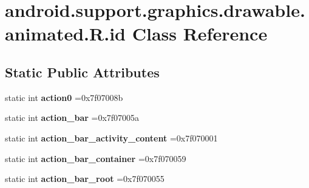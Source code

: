 \hypertarget{classandroid_1_1support_1_1graphics_1_1drawable_1_1animated_1_1R_1_1id}{}\section{android.\+support.\+graphics.\+drawable.\+animated.\+R.\+id Class Reference}
\label{classandroid_1_1support_1_1graphics_1_1drawable_1_1animated_1_1R_1_1id}
\subsection*{Static Public Attributes}
\begin{DoxyCompactItemize}
\item 
\mbox{\label{classandroid_1_1support_1_1graphics_1_1drawable_1_1animated_1_1R_1_1id_ae60d26279e96b553af1dbedf786c1719}} 
static int {\bfseries action0} =0x7f07008b
\item 
\mbox{\label{classandroid_1_1support_1_1graphics_1_1drawable_1_1animated_1_1R_1_1id_a273f56231c5bf8eebfc4998f29507892}} 
static int {\bfseries action\+\_\+bar} =0x7f07005a
\item 
\mbox{\label{classandroid_1_1support_1_1graphics_1_1drawable_1_1animated_1_1R_1_1id_ac41a847570f88ac8ca2ac8d0fc96dca9}} 
static int {\bfseries action\+\_\+bar\+\_\+activity\+\_\+content} =0x7f070001
\item 
\mbox{\label{classandroid_1_1support_1_1graphics_1_1drawable_1_1animated_1_1R_1_1id_a9b200b4c92700563eb5355a774a4a4d0}} 
static int {\bfseries action\+\_\+bar\+\_\+container} =0x7f070059
\item 
\mbox{\label{classandroid_1_1support_1_1graphics_1_1drawable_1_1animated_1_1R_1_1id_a78301510e57388ea52932a209e67db60}} 
static int {\bfseries action\+\_\+bar\+\_\+root} =0x7f070055
\item 
\mbox{\label{classandroid_1_1support_1_1graphics_1_1drawable_1_1animated_1_1R_1_1id_a1097f978383e16950afd4e29c8951a33}} 

\end{DoxyCompactItemize}
